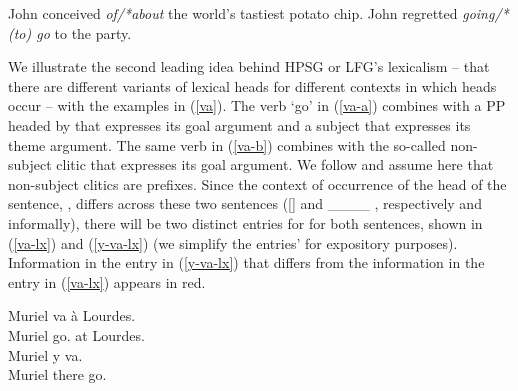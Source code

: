 \documentclass[output=paper
 	        ,biblatex
                ,babelshorthands
                ,newtxmath
                ,draftmode
                ,colorlinks, citecolor=brown
]{langscibook}
\begin{document}
\begin{exe}
	\ex\label{select}
	\begin{xlist}
		\ex\label{select-a}John conceived \emph{of/*about} the world's tastiest potato chip.
		\ex\label{select-b} John regretted \emph{going/*(to) go} to the party.
	\end{xlist}
\end{exe} 


We illustrate the second leading idea behind HPSG or LFG's lexicalism  -- that there are different variants of lexical heads for different contexts in which heads occur -- with the  examples in (\ref{va}).  The verb  `go' in (\ref{va-a}) combines with a PP headed by  that expresses its goal argument and a subject that expresses its theme argument. The same verb in (\ref{va-b}) combines with the so-called non-subject clitic  that expresses its goal argument. We follow \citet{MillerandSag1997} and assume here that  non-subject clitics are prefixes. Since the context of occurrence of the head of the sentence, , differs across these two sentences ([] and  \_\_\_\_ , respectively and informally), there will be two distinct entries for  for both sentences, shown in (\ref{va-lx}) and (\ref{y-va-lx}) (we simplify the entries'  for expository purposes). Information in the entry in (\ref{y-va-lx}) that differs from the information in the entry in (\ref{va-lx}) appears in red.

\begin{exe}
	\ex\label{va}
	\begin{xlist}
		\ex\label{va-a} \gll Muriel va à Lourdes. \\
		Muriel go. at Lourdes. \\
		\ex\label{va-b} \gll Muriel y va. \\
		Muriel there go.\ig{pres.3rd.sg} \\
	\end{xlist}	
\end{exe}
\end{document}
